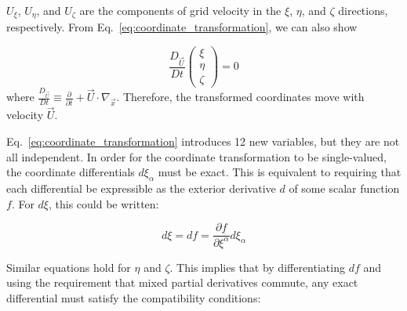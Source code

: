 \documentclass[12pt,letterpaper]{article}
\begin{document}
$U_\xi$, $U_\eta$, and $U_\zeta$ are the components of grid velocity
in the $\xi$, $\eta$, and $\zeta$ directions, respectively. 
From Eq.~\ref{eq:coordinate_transformation}, we can also show

\begin{equation}
\label{eq:moving_computational_cells}
\frac{D_{\vec{U}}}{Dt}
\left(
\begin{array}{c}\xi\\\eta\\\zeta\end{array}
\right)=0
\end{equation}
\noindent where $\frac{D_{\vec{U}}}{Dt}\equiv\frac{\partial}{\partial
  t}+\vec{U}\cdot\nabla_{\vec{x}}$. Therefore, the transformed
coordinates move with velocity $\vec{U}$.

Eq.~\ref{eq:coordinate_transformation} introduces 12 new variables,
but they are not all independent. In order for the coordinate
transformation to be single-valued, the coordinate differentials 
$d\xi_\alpha$  must be exact.\cite{hui99} This is equivalent to requiring that 
each differential be expressible as the exterior derivative $d$ of 
some scalar function $f$. For $d\xi$, this could be written:

\begin{equation}
d\xi = df = \frac{\partial f}{\partial \xi^\alpha}d\xi_\alpha
\end{equation}

Similar equations hold for $\eta$ and $\zeta$. This implies that by differentiating $df$ and using the requirement
that mixed partial derivatives commute, any exact differential must
satisfy the compatibility conditions:
\end{document}
